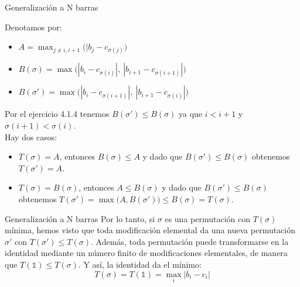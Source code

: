 \documentclass{beamer}
\begin{document}
\begin{frame}{Generalización a N barras}

Denotamos por:
\begin{itemize}
    \item $A= \max_{j\neq i, i+1} \big( |b_j - c_{\sigma(j)} \big)$
    \pause
    \item $B(\sigma) = \max \big( |b_i - c_{\sigma(i)}|,\ |b_{i+1} - c_{\sigma(i+1)}| \big)$
    \pause
    \item $B(\sigma') = \max \big( |b_i - c_{\sigma(i+1)}|,\ |b_{i+1} - c_{\sigma(i)}| \big)$
\end{itemize}
    \pause
    Por el ejercicio 4.1.4 tenemos \(B(\sigma') \leq B(\sigma)\) ya que \(i<i+1\) y \(\sigma(i+1)<\sigma(i) \). \\
    \pause Hay dos casos:
    \begin{itemize}
		\item
			$T(\sigma) = A$, \pause 
            entonces $B(\sigma) \leq A$ y dado que $B(\sigma') \leq B(\sigma)$ obtenemos $T(\sigma') = A$. \pause
		\item
			$T(\sigma) = B(\sigma)$, \pause
            entonces $A \leq B(\sigma)$ y dado que $B(\sigma') \leq B(\sigma)$ obtenemos $T(\sigma') = \max \big( A, B(\sigma') \big) \leq B(\sigma) = T(\sigma)$.
	\end{itemize}
\end{frame}
\begin{frame}{Generalización a N barras}
    Por lo tanto, si $\sigma$ es una permutación con $T(\sigma)$ mínima, 
    \pause hemos visto que toda modificación elemental da una nueva permutación $\sigma'$ con $T(\sigma')\leq T(\sigma)$. \pause
    Además, toda permutación puede transformarse en la identidad mediante un número finito de modificaciones elementales, de manera que $T(\mathds{1}) \leq T(\sigma)$. \pause
    Y así, la identidad da el mínimo:
    \[T(\sigma) = T(\mathds{1}) = \max_i |b_i - c_i|\]
    
\end{frame}
\end{document}
